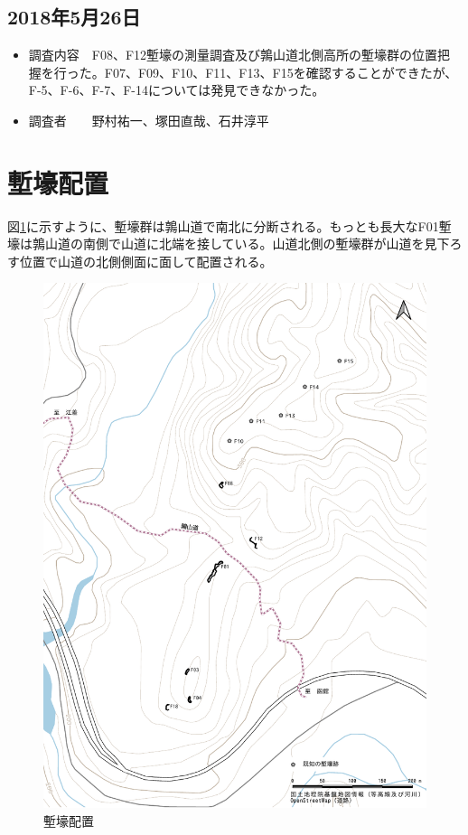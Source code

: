 \documentclass[14Q]{jsarticle}
\begin{document}
\subsection{2018年5月26日}
\begin{itemize}
\item 調査内容　F08、F12塹壕の測量調査及び鶉山道北側高所の塹壕群の位置把握を行った。F07、F09、F10、F11、F13、F15を確認することができたが、F-5、F-6、F-7、F-14については発見できなかった。
\item 調査者　　野村祐一、塚田直哉、石井淳平
\end{itemize}

\section{塹壕配置}
図\ref{haiti_tate}に示すように、塹壕群は鶉山道で南北に分断される。もっとも長大なF01塹壕は鶉山道の南側で山道に北端を接している。山道北側の塹壕群が山道を見下ろす位置で山道の北側側面に面して配置される。

\begin{figure}[h]
\centering
\includegraphics[width=160truemm]{fig/haitizu_tate.pdf}
\caption{塹壕配置}
\label{haiti_tate}
\end{figure}
\end{document}
